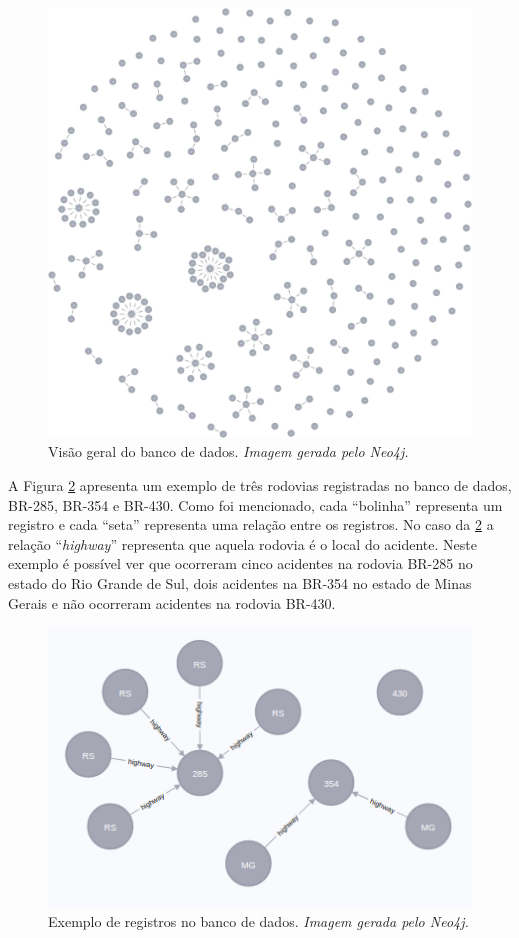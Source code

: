       \begin{figure}[!h]
	\centering
	\includegraphics[scale = 0.1]{figuras/graph.png}
	\caption[Visão geral do banco de dados]{Visão geral do banco de dados. \textit{Imagem gerada pelo Neo4j.}}
	\label{fig:db_general_view}
      \end{figure}
      
      A Figura \ref{fig:db_example} apresenta um exemplo de três rodovias registradas no banco de dados, BR-285, BR-354 e BR-430.
      Como foi mencionado, cada ``bolinha'' representa um registro e cada ``seta'' representa uma relação entre os registros.
      No caso da \ref{fig:db_example} a relação ``\textit{highway}'' representa que aquela rodovia é o local do acidente.
      Neste exemplo é possível ver que ocorreram cinco acidentes na rodovia BR-285 no estado do Rio Grande de Sul, dois acidentes
      na BR-354 no estado de Minas Gerais e não ocorreram acidentes na rodovia BR-430.
      
      
      \begin{figure}[!h]
	\centering
	\includegraphics[scale = 0.7]{figuras/db_example.png}
	\caption[Exemplo de registros no banco de dados]{Exemplo de registros no banco de dados. \textit{Imagem gerada pelo Neo4j.}}
	\label{fig:db_example}
      \end{figure}
      
